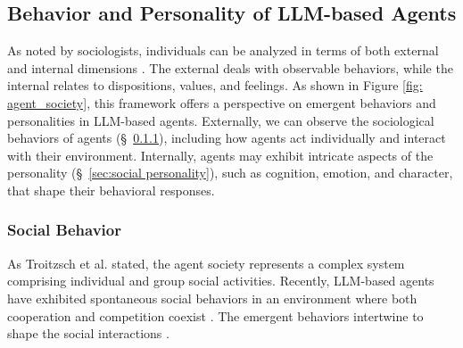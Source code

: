 \subsection{Behavior and Personality of LLM-based Agents}\label{sec:Behavior and Personality}
As noted by sociologists, individuals can be analyzed in terms of both external and internal dimensions \cite{inkeles1974becoming}. The external deals with observable behaviors, while the internal relates to dispositions, values, and feelings.
As shown in Figure \ref{fig: agent_society}, this framework offers a perspective on emergent behaviors and personalities in LLM-based agents. 
Externally, we can observe the sociological behaviors of agents (\S \ \ref{sec:social behavior}), including how agents act individually and interact with their environment. 
Internally, agents may exhibit intricate aspects of the personality (\S \ \ref{sec:social personality}), such as cognition, emotion, and character, that shape their behavioral responses.
\subsubsection{Social Behavior}\label{sec:social behavior}
As Troitzsch et al. \cite{DBLP:conf/dagstuhl/1995soscsi} stated, the agent society represents a complex system comprising individual and group social activities. Recently, LLM-based agents have exhibited spontaneous social behaviors in an environment where both cooperation and competition coexist \cite{xu2023exploring}. The emergent behaviors intertwine to shape the social interactions \cite{DBLP:journals/corr/abs-2307-14984}.
